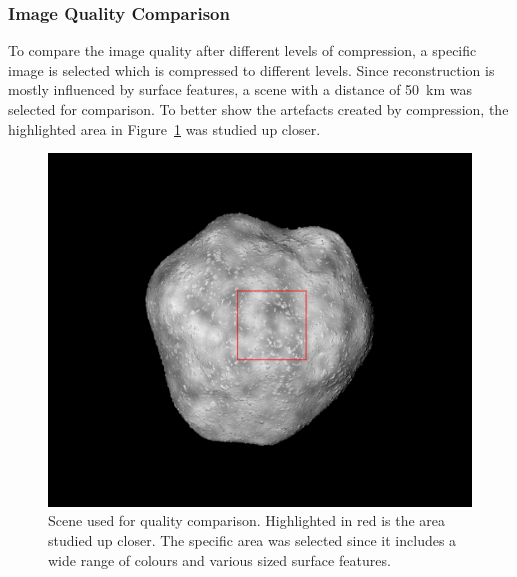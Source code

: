\subsubsection{Image Quality Comparison} \label{sec:img_quali_comp}
To compare the image quality after different levels of compression, a specific image is selected which is compressed to different levels. Since reconstruction is mostly influenced by surface features, a scene with a distance of \SI{50}{\kilo\meter} was selected for comparison. To better show the artefacts created by compression, the highlighted area in Figure~\ref{fig:img_quality_frame} was studied up closer.

\begin{figure}[htb]
    \centering
    \includegraphics[width=.7\textwidth]{doc/thesis/0_figures/compare_quality/set1/jp2_1000_frame.png}
    \caption{Scene used for quality comparison. Highlighted in red is the area studied up closer. The specific area was selected since it includes a wide range of colours and various sized surface features.}
    \label{fig:img_quality_frame}
\end{figure}

